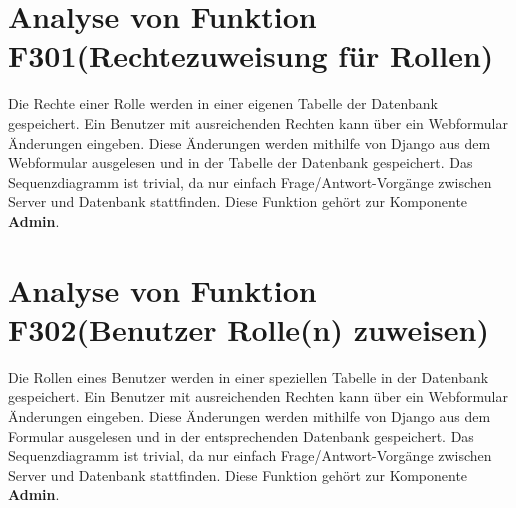 \section{Analyse von Funktion F301(Rechtezuweisung für Rollen)}
Die Rechte einer Rolle werden in einer eigenen Tabelle der Datenbank gespeichert. Ein Benutzer mit ausreichenden Rechten kann über ein Webformular Änderungen eingeben. Diese Änderungen werden mithilfe von Django aus dem Webformular ausgelesen und in der Tabelle der Datenbank gespeichert. Das Sequenzdiagramm ist trivial, da nur einfach Frage/Antwort-Vorgänge zwischen Server und Datenbank stattfinden. Diese Funktion gehört zur Komponente \textbf{Admin}.

\section{Analyse von Funktion F302(Benutzer Rolle(n) zuweisen)}
Die Rollen eines Benutzer werden in einer speziellen Tabelle in der Datenbank gespeichert. Ein Benutzer mit ausreichenden Rechten kann über ein Webformular Änderungen eingeben. Diese Änderungen werden mithilfe von Django aus dem Formular ausgelesen und in der entsprechenden Datenbank gespeichert. Das Sequenzdiagramm ist trivial, da nur einfach Frage/Antwort-Vorgänge zwischen Server und Datenbank stattfinden. Diese Funktion gehört zur Komponente \textbf{Admin}.
